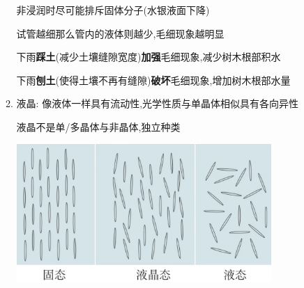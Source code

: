 \documentclass{article}
\begin{document}
\begin{enumerate}
\begin{enumerate}[label = (\arabic*)]
\begin{minipage}{0.7\textwidth}
                        非浸润时尽可能排斥固体分子(水银液面下降)

                        试管越细那么管内的液体则越少,毛细现象越明显

                        下雨\textbf{踩土}(减少土壤缝隙宽度)\textbf{加强}毛细现象,减少树木根部积水

                        下雨\textbf{刨土}(使得土壤不再有缝隙)\textbf{破坏}毛细现象,增加树木根部水量
                    \end{minipage}

              \item 液晶: 像液体一样具有流动性,光学性质与单晶体相似具有各向异性

                    \hspace{2.7em} 液晶不是单/多晶体与非晶体,独立种类

                    \begin{center}
                        \includegraphics[width = 0.8\textwidth]{./pictures/25.png}
                    \end{center}
          \end{enumerate}
\end{enumerate}

\vspace{2em}
\end{document}
